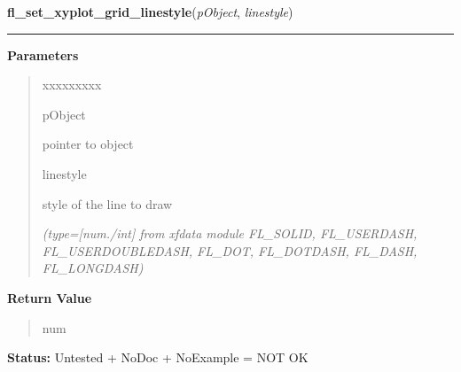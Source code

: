     \label{xformslib:library:fl_set_xyplot_grid_linestyle}

    \vspace{0.5ex}

\hspace{.8\funcindent}\begin{boxedminipage}{\funcwidth}

    \raggedright \textbf{fl\_set\_xyplot\_grid\_linestyle}(\textit{pObject}, \textit{linestyle})

    \vspace{-1.5ex}

    \rule{\textwidth}{0.5\fboxrule}
\setlength{\parskip}{2ex}
\setlength{\parskip}{1ex}
      \textbf{Parameters}
      \vspace{-1ex}

      \begin{quote}
        \begin{Ventry}{xxxxxxxxx}

          \item[pObject]

          pointer to object

          \item[linestyle]

          style of the line to draw

            {\it (type=[num./int] from xfdata module FL\_SOLID, FL\_USERDASH, FL\_USERDOUBLEDASH, 
FL\_DOT, FL\_DOTDASH, FL\_DASH, FL\_LONGDASH)}

        \end{Ventry}

      \end{quote}

      \textbf{Return Value}
    \vspace{-1ex}

      \begin{quote}
      num

      \end{quote}

\textbf{Status:} Untested + NoDoc + NoExample = NOT OK



    \end{boxedminipage}

    \label{xformslib:library:fl_set_xyplot_alphaxtics}

